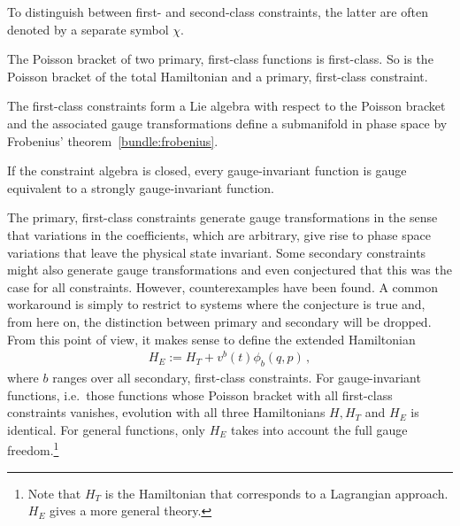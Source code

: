     \begin{notation}
        To distinguish between first- and second-class constraints, the latter are often denoted by a separate symbol $\chi$.
    \end{notation}
    \begin{property}[Closure]
        The Poisson bracket of two primary, first-class functions is first-class. So is the Poisson bracket of the total Hamiltonian and a primary, first-class constraint.
    \end{property}
    \begin{result}
        The first-class constraints form a Lie algebra with respect to the Poisson bracket and the associated gauge transformations define a submanifold in phase space by Frobenius' theorem~\ref{bundle:frobenius}.
    \end{result}

    \begin{property}
        If the constraint algebra is closed, every gauge-invariant function is gauge equivalent to a strongly gauge-invariant function.
    \end{property}

    \begin{remark}
        The primary, first-class constraints generate gauge transformations in the sense that variations in the coefficients, which are arbitrary, give rise to phase space variations that leave the physical state invariant. Some secondary constraints might also generate gauge transformations and  even conjectured that this was the case for all constraints. However, counterexamples have been found. A common workaround is simply to restrict to systems where the conjecture is true and, from here on, the distinction between primary and secondary will be dropped.\mnote{\dbend} From this point of view, it makes sense to define the extended Hamiltonian
        \begin{gather}
            \label{constraint:extended_hamiltonian}
            H_E := H_T + v^b(t)\phi_b(q,p)\,,
        \end{gather}
        where $b$ ranges over all secondary, first-class constraints. For gauge-invariant functions, i.e.~those functions whose Poisson bracket with all first-class constraints vanishes, evolution with all three Hamiltonians $H,H_T$ and $H_E$ is identical. For general functions, only $H_E$ takes into account the full gauge freedom.\footnote{Note that $H_T$ is the Hamiltonian that corresponds to a Lagrangian approach. $H_E$ gives a more general theory.}
    \end{remark}


